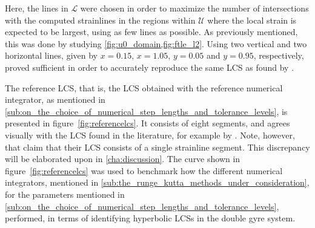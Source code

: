 Here, the lines in $\mathcal{L}$ were chosen in order to maximize the number of
intersections with the computed strainlines in the regions within $\mathcal{U}$
where the local strain is expected to be largest, using as few lines as
possible. As previously mentioned, this was done by studying
\cref{fig:u0_domain,fig:ftle_l2}. Using two vertical and two horizontal lines,
given by $x=0.15$, $x=1.05$, $y=0.05$ and $y=0.95$, respectively, proved
sufficient in order to accurately reproduce the same LCS as found by
\textcite{farazmand2012computing}.




\clearpage
The reference LCS, that is, the LCS obtained with the reference numerical
integrator, as mentioned in
\cref{sub:on_the_choice_of_numerical_step_lengths_and_tolerance_levels}, is
presented in figure~\ref{fig:referencelcs}. It consists of eight segments,
and agrees visually with the LCS found in the literature, for example by
\textcite{farazmand2012computing}. Note, however, that
\citeauthor{farazmand2012computing} claim that their LCS consists of a single
strainline segment. This discrepancy will be elaborated upon in
\cref{cha:discussion}. The curve shown in figure~\ref{fig:referencelcs} was used to
benchmark how the different numerical integrators, mentioned in
\cref{sub:the_runge_kutta_methods_under_consideration}, for the parameters
mentioned in
\cref{sub:on_the_choice_of_numerical_step_lengths_and_tolerance_levels},
performed, in terms of identifying hyperbolic LCSs in the double gyre system.





